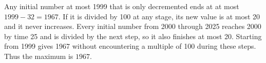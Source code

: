 Any initial number at most 1999 that is only decremented ends at at most $1999-32=1967$. If it is divided by 100 at any stage, its new value is at most 20 and it never increases. Every initial number from 2000 through 2025 reaches 2000 by time 25 and is divided by the next step, so it also finishes at most 20. Starting from 1999 gives 1967 without encountering a multiple of 100 during these steps. Thus the maximum is $\boxed{1967}$.

